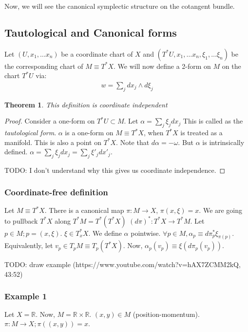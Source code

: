 \documentclass[11pt]{book}
\newcommand{\R}{\ensuremath{\mathbb R}}
\newtheorem{theorem}{Theorem}
\newtheorem{proof}{Proof}
\begin{document}
Now, we will see the canonical symplectic structure on the cotangent bundle.
\subsection{Tautological and Canonical forms}
Let $(U, x_1, \dots x_n)$ be a coordinate chart of $X$ and 
$(T^*U, x_1, \dots x_n, \xi_1, \dots \xi_n)$ 
be the corresponding chart of $M \equiv T^*X$. We will now define a 2-form
on $M$ on the chart $T^*U$ via:
\begin{align*}
    w = \sum_j dx_j \wedge d\xi_j
\end{align*}

\begin{theorem}
     This definition is coordinate independent
 \end{theorem}
 \begin{proof}
     Consider a one-form on $T^*U \subset M$. Let $\alpha = \sum_j \xi_j dx_j$ 
     This is called as the \emph{tautological form}.
     $\alpha$ is a one-form on $M \equiv T^*X$, when $T^*X$ is treated as a manifold.
     This is also a point on $T^* X$.
     Note that $d \alpha = - \omega$. But $\alpha$ is intrinsically defined.
     $\alpha =  \sum_j \xi_j dx_j = \sum_j \xi'_j dx'_j$.

     TODO: I don't understand why this gives us coordinate independence.
 \end{proof}

\subsubsection{Coordinate-free definition}

Let $M \equiv T^* X$. There is a canonical map $\pi: M \rightarrow X$, 
$\pi(x, \xi) = x$. We are going to pullback $T^* X$ along $T^* M = T^* (T^* X)$
$(d\pi)^*: T^*X \rightarrow T^*M$.
Let $p \in M; p = (x, \xi)$. $\xi \in T_x^* X$.
We define $\alpha$ pointwise. $\forall p \in M, \alpha_p \equiv  d\pi_p^* \xi_{\pi(p)}$.
Equivalently, let $v_p \in T_p M \equiv T_p (T^*X)$. Now, $\alpha_p (v_p) \equiv \xi( d\pi_p (v_p))$.

TODO: draw example (https://www.youtube.com/watch?v=hAX7ZCMM2kQ, 43:52)

\subsubsection{Example 1}
Let $X = \R$. Now, $M = \R \times \R$. $(x, y) \in M$ (position-momentum).
$\pi: M \rightarrow X; \pi((x, y)) = x$.
\end{document}
